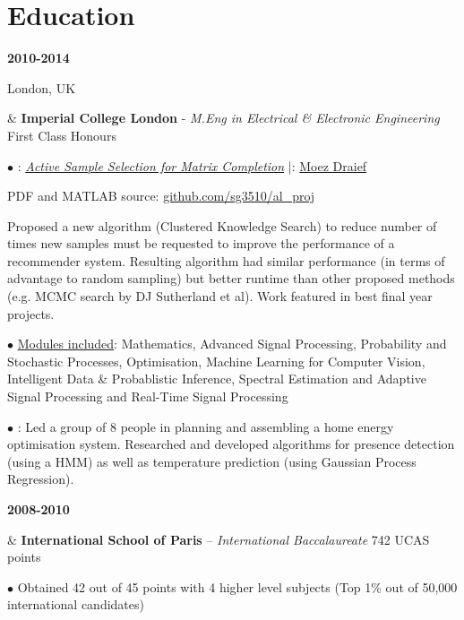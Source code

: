 \documentclass[a4paper,10pt,oneside]{article}
\begin{document}
\section*{Education}
\begin{body}

{\textbf{2010-2014} \par London, UK} & \textbf{Imperial College London} - \textit{M.Eng in Electrical \& Electronic Engineering} \hfill First Class Honours 



$\bullet$ \underline{}: \href{http://sg3510.github.io/al_proj/Report/thesis.pdf}{\textit{Active Sample Selection for Matrix Completion}} \hfill|\hfill  \underline{}: \href{http://www.iis.ee.ic.ac.uk/m.draief}{Moez Draief}

PDF and MATLAB source: \href{https://github.com/sg3510/al_proj}{github.com/sg3510/al\_proj}

Proposed a new algorithm (Clustered Knowledge Search) to reduce number of times new samples must be requested to improve the performance of a recommender system. Resulting algorithm had similar performance (in terms of advantage to random sampling) but better runtime than other proposed methods (e.g. MCMC search by DJ Sutherland et al). Work featured in best final year projects.

$\bullet$ \underline{Modules included}: Mathematics, Advanced Signal Processing, Probability and Stochastic Processes, Optimisation, Machine Learning for Computer Vision, Intelligent Data \& Probablistic Inference, Spectral Estimation and Adaptive Signal Processing and Real-Time Signal Processing


$\bullet$ \href{https://github.com/sg3510/home-automation-yr3proj}{\underline{}}: Led a group of 8 people in planning and assembling a home energy optimisation system. Researched and developed algorithms for presence detection (using a HMM) as well as temperature prediction (using Gaussian Process Regression).
\\ 
{\textbf{2008-2010} \par {} } & \textbf{International School of Paris} – \textit{International Baccalaureate} \hfill 742 UCAS points

$\bullet$ Obtained 42 out of 45 points with 4 higher level subjects (Top 1\% out of 50,000 international candidates)

\end{body}
\end{document}
